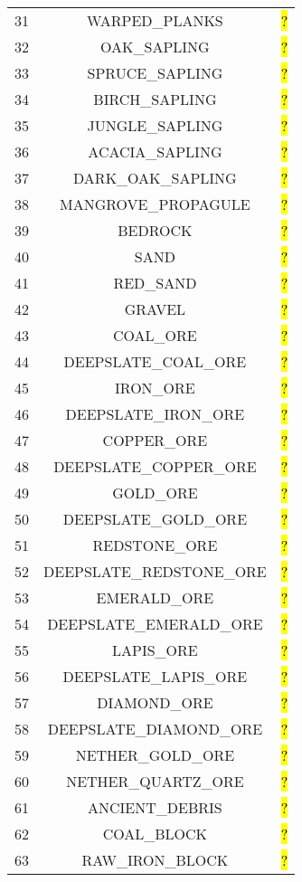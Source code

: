 \documentclass[11pt]{article}
\newcommand\myworries[1]{\sethlcolor{red}\hl{#1}}
\begin{document}
\begin{longtable}{ |c|c|c| }
31 & WARPED\_PLANKS & \myworries{?} \\
32 & OAK\_SAPLING & \myworries{?} \\
33 & SPRUCE\_SAPLING & \myworries{?} \\
34 & BIRCH\_SAPLING & \myworries{?} \\
35 & JUNGLE\_SAPLING & \myworries{?} \\
36 & ACACIA\_SAPLING & \myworries{?} \\
37 & DARK\_OAK\_SAPLING & \myworries{?} \\
38 & MANGROVE\_PROPAGULE & \myworries{?} \\
39 & BEDROCK & \myworries{?} \\
40 & SAND & \myworries{?} \\
41 & RED\_SAND & \myworries{?} \\
42 & GRAVEL & \myworries{?} \\
43 & COAL\_ORE & \myworries{?} \\
44 & DEEPSLATE\_COAL\_ORE & \myworries{?} \\
45 & IRON\_ORE & \myworries{?} \\
46 & DEEPSLATE\_IRON\_ORE & \myworries{?} \\
47 & COPPER\_ORE & \myworries{?} \\
48 & DEEPSLATE\_COPPER\_ORE & \myworries{?} \\
49 & GOLD\_ORE & \myworries{?} \\
50 & DEEPSLATE\_GOLD\_ORE & \myworries{?} \\
51 & REDSTONE\_ORE & \myworries{?} \\
52 & DEEPSLATE\_REDSTONE\_ORE & \myworries{?} \\
53 & EMERALD\_ORE & \myworries{?} \\
54 & DEEPSLATE\_EMERALD\_ORE & \myworries{?} \\
55 & LAPIS\_ORE & \myworries{?} \\
56 & DEEPSLATE\_LAPIS\_ORE & \myworries{?} \\
57 & DIAMOND\_ORE & \myworries{?} \\
58 & DEEPSLATE\_DIAMOND\_ORE & \myworries{?} \\
59 & NETHER\_GOLD\_ORE & \myworries{?} \\
60 & NETHER\_QUARTZ\_ORE & \myworries{?} \\
61 & ANCIENT\_DEBRIS & \myworries{?} \\
62 & COAL\_BLOCK & \myworries{?} \\
63 & RAW\_IRON\_BLOCK & \myworries{?} \\

\end{longtable}
\end{document}
